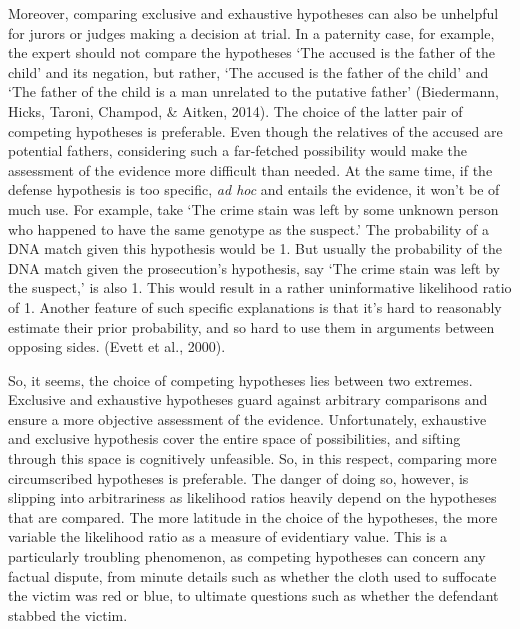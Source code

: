 \documentclass[10pt,dvipsnames,enabledeprecatedfontcommands]{scrartcl}
\begin{document}
Moreover, comparing exclusive and exhaustive hypotheses can also be
unhelpful for jurors or judges making a decision at trial. In a
paternity case, for example, the expert should not compare the
hypotheses `The accused is the father of the child' and its negation,
but rather, `The accused is the father of the child' and `The father of
the child is a man unrelated to the putative father' (Biedermann, Hicks,
Taroni, Champod, \& Aitken, 2014). The choice of the latter pair of
competing hypotheses is preferable. Even though the relatives of the
accused are potential fathers, considering such a far-fetched
possibility would make the assessment of the evidence more difficult
than needed. At the same time, if the defense hypothesis is too
specific, \textit{ad hoc} and entails the evidence, it won't be of much
use. For example, take `The crime stain was left by some unknown person
who happened to have the same genotype as the suspect.' The probability
of a DNA match given this hypothesis would be 1. But usually the
probability of the DNA match given the prosecution's hypothesis, say
`The crime stain was left by the suspect,' is also 1. This would result
in a rather uninformative likelihood ratio of 1. Another feature of such
specific explanations is that it's hard to reasonably estimate their
prior probability, and so hard to use them in arguments between opposing
sides. (Evett et al., 2000).


So, it seems, the choice of competing hypotheses lies between two
extremes. Exclusive and exhaustive hypotheses guard against arbitrary
comparisons and ensure a more objective assessment of the evidence.
Unfortunately, exhaustive and exclusive hypothesis cover the entire
space of possibilities, and sifting through this space is cognitively
unfeasible. So, in this respect, comparing more circumscribed hypotheses
is preferable. The danger of doing so, however, is slipping into
arbitrariness as likelihood ratios heavily depend on the hypotheses that
are compared. The more latitude in the choice of the hypotheses, the
more variable the likelihood ratio as a measure of evidentiary value.
This is a particularly troubling phenomenon, as competing hypotheses can
concern any factual dispute, from minute details such as whether the
cloth used to suffocate the victim was red or blue, to ultimate
questions such as whether the defendant stabbed the victim.
\end{document}
